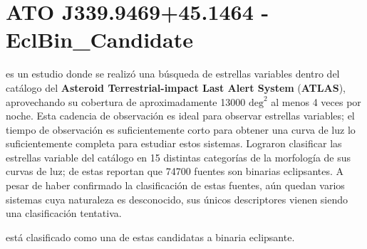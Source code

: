 \section{ATO J339.9469+45.1464 - EclBin\_Candidate}


\citet{atlasATOObjectDiscovery} es un estudio donde se realizó una búsqueda de estrellas variables dentro del catálogo del \textbf{Asteroid Terrestrial-impact Last Alert System} (\textbf{ATLAS}), aprovechando su cobertura de aproximadamente \num{13000} $\mathrm{deg}^2$ al menos 4 veces por noche. Esta cadencia de observación es ideal para observar estrellas variables; el tiempo de observación es suficientemente corto para obtener una curva de luz lo suficientemente completa para estudiar estos sistemas. Lograron clasificar las estrellas variable del catálogo en 15 distintas categorías de la morfología de sus curvas de luz; de estas reportan que \num{74700} fuentes son binarias eclipsantes. A pesar de haber confirmado la clasificación de estas fuentes, aún quedan varios sistemas cuya naturaleza es desconocido, sus únicos descriptores vienen siendo una clasificación tentativa.

\textbf{\atoObjId} está clasificado como una de estas candidatas a binaria eclipsante. 